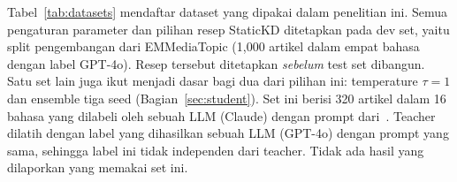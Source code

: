 \documentclass[journal]{IEEEtran}
\begin{document}
Tabel~\ref{tab:datasets} mendaftar dataset yang dipakai dalam penelitian ini. Semua pengaturan parameter dan pilihan resep StaticKD ditetapkan pada dev set, yaitu split pengembangan dari EMMediaTopic (1,000 artikel dalam empat bahasa dengan label GPT-4o). Resep tersebut ditetapkan \emph{sebelum} test set dibangun. Satu set lain juga ikut menjadi dasar bagi dua dari pilihan ini: temperature $\tau=1$ dan ensemble tiga seed (Bagian~\ref{sec:student}). Set ini berisi 320 artikel dalam 16 bahasa yang dilabeli oleh sebuah LLM (Claude) dengan prompt dari~\cite{kuzman2025llm}. Teacher dilatih dengan label yang dihasilkan sebuah LLM (GPT-4o) dengan prompt yang sama, sehingga label ini tidak independen dari teacher. Tidak ada hasil yang dilaporkan yang memakai set ini.

\begin{table}[!t]
\caption{Data Sets of the Study and Their Roles}
\label{tab:datasets}
\centering
\footnotesize
\setlength{\tabcolsep}{3pt}
\end{table}
\end{document}
